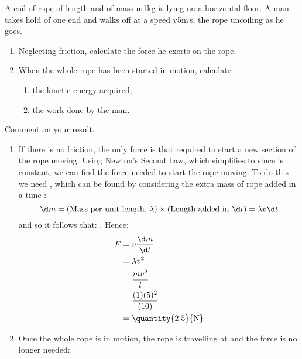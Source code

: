 
\begin{problem} 
{A coil of rope of length  and of mass {m}{1}{kg} is lying on a horizontal floor. A man takes hold of one end and walks off at a speed {v}{5}{m\,s}, the rope uncoiling as he goes.
\begin{enumerate}
	\item Neglecting friction, calculate the force he exerts on the rope.
	\item When the whole rope has been started in motion, calculate:
	\begin{enumerate}
		\item the kinetic energy acquired,
		\item the work done by the man.
	\end{enumerate}
\end{enumerate}
Comment on your result.
}{
}{ %
\begin{enumerate}
	\item If there is no friction, the only force is that required to start a new section of the rope moving. Using Newton's Second Law,  which simplifies to  since  is constant, we can find the force needed to start the rope moving. To do this we need , which can be found by considering the extra mass of rope added in a time :
\begin{equation*} 
\d m = (\text{Mass per unit length, }\lambda)\times(\text{Length added in } \d t) = \lambda v \d t 
\end{equation*}
and so it follows that: .
Hence:
\begin{eqnarray*} 
F &= v\frac{\d m}{\d t} \\ 
&= \lambda v^{2} \\ 
&= \frac{mv^{2}}{l} \\ 
&= \frac{(1)(5)^{2}}{(10)}\\ 
&= \mbox{\quantity{2.5}{N}}
\end{eqnarray*}
\item Once the whole rope is in motion, the rope is travelling at  and the force is no longer needed:

\end{enumerate}}
\end{problem}

